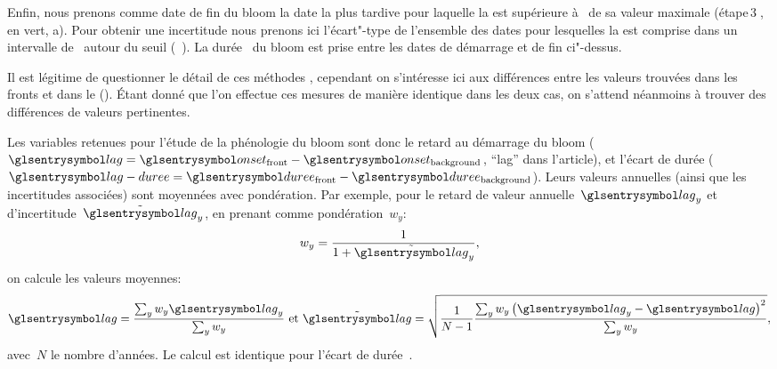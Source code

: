 \begin{figure}
  \centering
  \label{fig:bloom-lag}
\end{figure}

Enfin, nous prenons comme date de fin du bloom la date la plus tardive pour laquelle la  est supérieure à~ de sa valeur maximale (étape\,\textcircled{3}, en vert, a).
Pour obtenir une incertitude nous prenons ici l'écart"-type de l'ensemble des dates pour lesquelles la  est comprise dans un intervalle de~ autour du seuil (~).
La durée~ du bloom est prise entre les dates de démarrage et de fin ci"-dessus.

Il est légitime de questionner le détail de ces méthodes , cependant on s'intéresse ici aux différences entre les valeurs trouvées dans les fronts et dans le  ().
Étant donné que l'on effectue ces mesures de manière identique dans les deux cas, on s'attend néanmoins à trouver des différences de valeurs pertinentes.

Les variables retenues pour l'étude de la phénologie du bloom sont donc le retard au démarrage du bloom (\(\am{lag} = \am{onset}_\frt - \am{onset}_\bkg \), \enquote{lag} dans l'article), et l'écart de durée (\(\am{lag-duree} = \am{duree}_\frt - \am{duree}_\bkg\)).
Leurs valeurs annuelles (ainsi que les incertitudes associées) sont moyennées avec pondération.
Par exemple, pour le retard de valeur annuelle~\(\am{lag}_y\) et d'incertitude~\(\err{\am{lag}}_y\), en prenant comme pondération~\(w_y\):
\begin{equation}
  w_y = \frac 1 {1 + \err{\am{lag}}_y} ,
\end{equation}
on calcule les valeurs moyennes:
\begin{equation}
  \am{lag} = \frac {\sum_y w_y \am{lag}_y} {\sum_y w_y}
  \text{ et }
  \err{\am{lag}} = \sqrt{ \frac1{N-1} \frac {\sum_y w_y \paren{\am{lag}_y - \am{lag}}^2 } {\sum_y w_y} },
\end{equation}
avec~\(N\) le nombre d'années.
Le calcul est identique pour l'écart de durée~.
